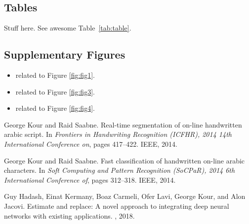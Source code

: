 \documentclass{article}
\begin{document}
\subsection{Tables}
Stuff here.
See awesome Table~\ref{tab:table}.

\subsection{Supplementary Figures}
\begin{itemize}
\item related to Figure \ref{fig:fig1}.
\item related to Figure \ref{fig:fig3}.
\item related to Figure \ref{fig:fig4}.
\end{itemize}


  


\begin{thebibliography}{1}

George Kour and Raid Saabne.
\newblock Real-time segmentation of on-line handwritten arabic script.
\newblock In {\em Frontiers in Handwriting Recognition (ICFHR), 2014 14th
  International Conference on}, pages 417--422. IEEE, 2014.

George Kour and Raid Saabne.
\newblock Fast classification of handwritten on-line arabic characters.
\newblock In {\em Soft Computing and Pattern Recognition (SoCPaR), 2014 6th
  International Conference of}, pages 312--318. IEEE, 2014.

Guy Hadash, Einat Kermany, Boaz Carmeli, Ofer Lavi, George Kour, and Alon
  Jacovi.
\newblock Estimate and replace: A novel approach to integrating deep neural
  networks with existing applications.
, 2018.

\end{thebibliography}
\end{document}
